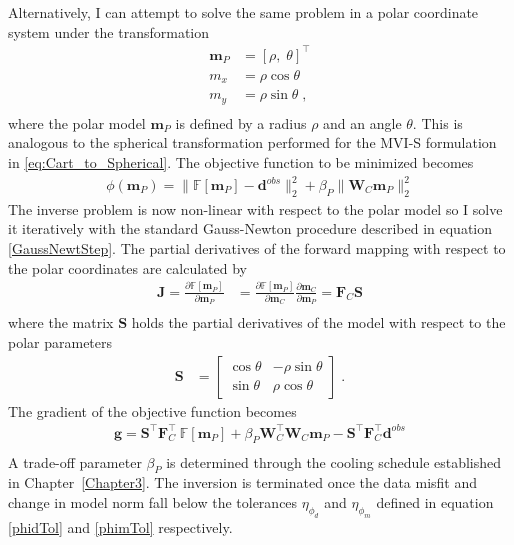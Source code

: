 Alternatively, I can attempt to solve the same problem in a polar coordinate system under the transformation
\begin{equation}
\begin{split}
	\mathbf{m}_P &= [\rho,\;\theta]^\top\\
	m_x &= \rho \cos{\theta} \\
	m_y &= \rho \sin{\theta} \;,\\
\end{split}
\end{equation}
where the polar model $\mathbf{m}_P$ is defined by a radius $\rho$ and an angle $\theta$. This is analogous to the spherical transformation performed for the MVI-S formulation in \eqref{eq:Cart_to_Spherical}. 
The objective function to be minimized becomes
\begin{equation}\label{toyPolar}
\begin{split}
\phi(\mathbf{m}_P)= \| \mathbb{F}[\mathbf{m}_P] - \mathbf{d}^{obs} \|_2^2 + \beta_P \| \mathbf{W}_C \mathbf{m}_P \|_2^2
\end{split}
\end{equation}
The inverse problem is now non-linear with respect to the polar model so I solve it iteratively with the standard Gauss-Newton procedure described in equation \eqref{GaussNewtStep}.
The partial derivatives of the forward mapping with respect to the polar coordinates are calculated by
\begin{equation}\begin{split}
\mathbf{J} = \frac{\partial \mathbb{F}[\mathbf{m}_P]}{\partial \mathbf{m}_P} &= \frac{\partial \mathbb{F}[\mathbf{m}_P]}{\partial \mathbf{m}_C} \frac{\partial \mathbf{m}_C}{\partial \mathbf{m}_P} = \mathbf{F}_C\mathbf{S} \\
\end{split}
\end{equation}
where the matrix $\mathbf{S}$ holds the partial derivatives of the model with respect to the polar parameters
\begin{equation}\label{nonlinF}\begin{split}
\mathbf{S} &=
\begin{bmatrix}
\cos{\theta} & -\rho\sin{\theta} \\
\sin{\theta} & \rho\cos{\theta}
\end{bmatrix} \;.
\end{split}
\end{equation}
The gradient of the objective function becomes
\begin{equation}\label{gradPolar}
\begin{split}
\mathbf{g} = \mathbf{S}^\top \mathbf{F}_C^\top \:\mathbb{F}[\mathbf{m}_P] + \beta_P \mathbf{W}_C^\top\mathbf{W}_C \mathbf{m}_P - \mathbf{S}^\top \mathbf{F}_C^\top \mathbf{d}^{obs} \\
\end{split}
\end{equation}
A trade-off parameter $\beta_P$ is determined through the cooling schedule established in Chapter~\ref{Chapter3}. The inversion is terminated once the data misfit and change in model norm fall below the tolerances $\eta_{\phi_d}$ and $\eta_{\phi_m}$ defined in equation \eqref{phidTol} and \eqref{phimTol} respectively.

